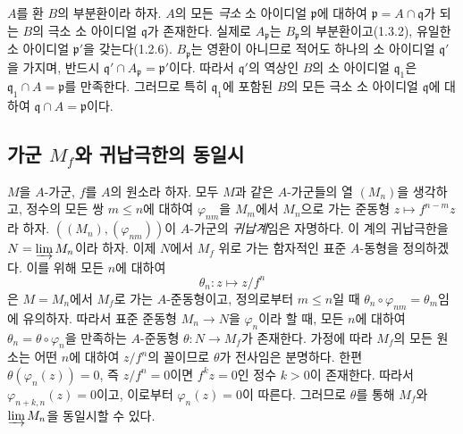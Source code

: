 \begin{env}[1.5.8]
\label{0.1.5.8-ko}
$A$를 환 $B$의 부분환이라 하자. $A$의 모든 \emph{극소} 소 아이디얼 $\mathfrak p$에 대하여 $\mathfrak p=A\cap\mathfrak q$가 되는 $B$의 극소 소 아이디얼 $\mathfrak q$가 존재한다. 실제로 $A_{\mathfrak p}$는 $B_{\mathfrak p}$의 부분환이고(1.3.2), 유일한 소 아이디얼 $\mathfrak p'$을 갖는다(1.2.6). $B_{\mathfrak p}$는 영환이 아니므로 적어도 하나의 소 아이디얼 $\mathfrak q'$을 가지며, 반드시 $\mathfrak q'\cap A_{\mathfrak p}=\mathfrak p'$이다. 따라서 $\mathfrak q'$의 역상인 $B$의 소 아이디얼 $\mathfrak q_1$은 $\mathfrak q_1\cap A=\mathfrak p$를 만족한다. 그러므로 특히 $\mathfrak q_1$에 포함된 $B$의 모든 극소 소 아이디얼 $\mathfrak q$에 대하여 $\mathfrak q\cap A=\mathfrak p$이다.
\end{env}

\subsection{가군 $M_f$와 귀납극한의 동일시}
\label{subsection:0.1.6-ko}

\begin{env}[1.6.1]
\label{0.1.6.1-ko}
$M$을 $A$-가군, $f$를 $A$의 원소라 하자. 모두 $M$과 같은 $A$-가군들의 열 $(M_n)$을 생각하고, 정수의 모든 쌍 $m\leq n$에 대하여 $\varphi_{nm}$을 $M_m$에서 $M_n$으로 가는 준동형 $z\mapsto f^{n-m}z$라 하자. $((M_n),(\varphi_{nm}))$이 $A$-가군의 \emph{귀납계}임은 자명하다. 이 계의 귀납극한을 $N=\varinjlim M_n$이라 하자. 이제 $N$에서 $M_f$ 위로 가는 함자적인 표준 $A$-동형을 정의하겠다. 이를 위해 모든 $n$에 대하여
\[
  \theta_n:z\longmapsto z/f^n
\]
은 $M=M_n$에서 $M_f$로 가는 $A$-준동형이고, 정의로부터 $m\leq n$일 때 $\theta_n\circ\varphi_{nm}=\theta_m$임에 유의하자. 따라서 표준 준동형 $M_n\to N$을 $\varphi_n$이라 할 때, 모든 $n$에 대하여 $\theta_n=\theta\circ\varphi_n$을 만족하는 $A$-준동형 $\theta:N\to M_f$가 존재한다. 가정에 따라 $M_f$의 모든 원소는 어떤 $n$에 대하여 $z/f^n$의 꼴이므로 $\theta$가 전사임은 분명하다. 한편 $\theta(\varphi_n(z))=0$, 즉 $z/f^n=0$이면 $f^kz=0$인 정수 $k>0$이 존재한다. 따라서 $\varphi_{n+k,n}(z)=0$이고, 이로부터 $\varphi_n(z)=0$이 따른다. 그러므로 $\theta$를 통해 $M_f$와 $\varinjlim M_n$을 동일시할 수 있다.
\end{env}

